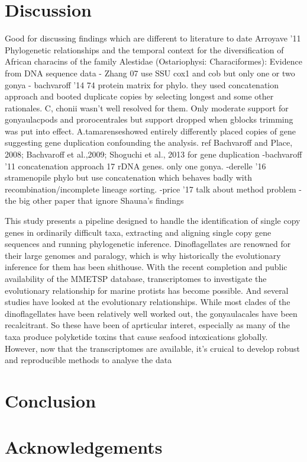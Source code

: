 \documentclass[12pt]{article}
\begin{document}
\section{Discussion}
Good for discussing findings which are different to literature to date Arroyave '11 Phylogenetic relationships and the temporal context for the diversification
of African characins of the family Alestidae (Ostariophysi: Characiformes): Evidence from DNA sequence data
- Zhang 07 use SSU cox1 and cob but only one or two gonya
- bachvaroff '14 74 protein matrix for phylo. they used concatenation approach and booted duplicate copies by selecting longest and some other rationales. C, chonii wasn't well resolved for them. Only moderate support for gonyaulacpods and prorocentrales but support dropped when gblocks trimming was put into effect. A.tamarenseshowed entirely differently placed copies of gene suggesting gene duplication confounding the analysis.  ref Bachvaroff and Place, 2008; Bachvaroff et al.,2009; Shoguchi et al., 2013 for gene duplication
-bachvaroff '11 concatenation approach 17 rDNA genes. only one gonya.
-derelle '16 stramenopile phylo but use concatenation which behaves badly with recombination/incomplete lineage sorting.
-price '17 talk about method problem
- the big other paper that ignore Shauna's findings

This study presents a pipeline designed to handle the identification of single copy genes in ordinarily difficult taxa, extracting and aligning single copy gene sequences and running phylogenetic inference. 
Dinoflagellates are renowned for their large genomes and paralogy, which is why historically the evolutionary inference for them has been shithouse. With the recent completion and public availability of the MMETSP database, transcriptomes to investigate the evolutionary relationship for marine protists has become possible. And several studies have looked at the evolutionary relationships. While most clades of the dinoflagellates have been relatively well worked out, the gonyaulacales have been recalcitrant. So these have been of aprticular interet, especially as many of the taxa produce polyketide toxins that cause seafood intoxications globally. However, now that the transcriptomes are available, it's cruical to develop robust and reproducible methods to analyse the data

\newpage
\section{Conclusion}
\newpage

\section{Acknowledgements}


\end{document}
